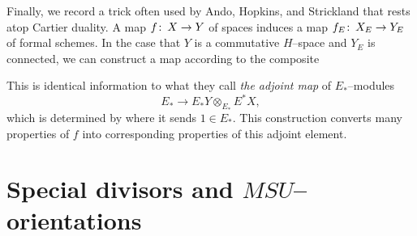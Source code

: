 \begin{remark}
Finally, we record a trick often used by Ando, Hopkins, and Strickland that rests atop Cartier duality.  A map $f\colon\thinspace X \to Y$ of spaces induces a map $f_E \colon\thinspace X_E \to Y_E$ of formal schemes.  In the case that $Y$ is a commutative $H$--space and $Y_E$ is connected, we can construct a map according to the composite
\begin{center}
\end{center}
This is identical information to what they call \textit{the adjoint map} of $E_*$--modules \[E_* \to E_* Y \widehat\otimes_{E_*} E^* X,\] which is determined by where it sends $1 \in E_*$.  This construction converts many properties of $f$ into corresponding properties of this adjoint element.
\end{remark}












\section{Special divisors and $MSU$--orientations}

